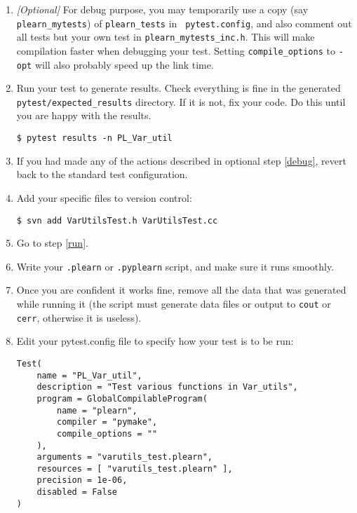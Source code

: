 \documentclass[11pt]{book}
\begin{document}
\begin{enumerate}
  \item \label{debug} {\em [Optional]} For debug purpose, you may temporarily use a
  copy (say {\tt plearn\_mytests}) of {\tt plearn\_tests} in {\tt
  pytest.config}, and also comment out all tests but your own test in
  {\tt plearn\_mytests\_inc.h}. This will make compilation faster when
  debugging your test. Setting {\tt compile\_options} to {\tt -opt} will
  also probably speed up the link time.

  \item Run your test to generate results. Check everything is fine in
  the generated {\tt pytest/expected\_results} directory. If it is not,
  fix your code. Do this until you are happy with the results.
\begin{verbatim}
$ pytest results -n PL_Var_util
\end{verbatim}

  \item If you had made any of the actions described in optional step
  \ref{debug}, revert back to the standard test configuration.

  \item Add your specific files to version control:
\begin{verbatim}
$ svn add VarUtilsTest.h VarUtilsTest.cc
\end{verbatim}

  \item Go to step \ref{run}.

  \item Write your {\tt .plearn} or {\tt .pyplearn} script, and make
  sure it runs smoothly.

  \item Once you are confident it works fine, remove all the data that
  was generated while running it (the script must generate data files
  or output to {\tt cout} or {\tt cerr}, otherwise it is useless).

  \item Edit your {pytest.config} file to specify how your test is to be
  run:
\begin{verbatim}
Test(
    name = "PL_Var_util",
    description = "Test various functions in Var_utils",
    program = GlobalCompilableProgram(
        name = "plearn",
        compiler = "pymake",
        compile_options = ""
    ),
    arguments = "varutils_test.plearn",
    resources = [ "varutils_test.plearn" ],
    precision = 1e-06,
    disabled = False
)
\end{verbatim}


\end{enumerate}
\end{document}
